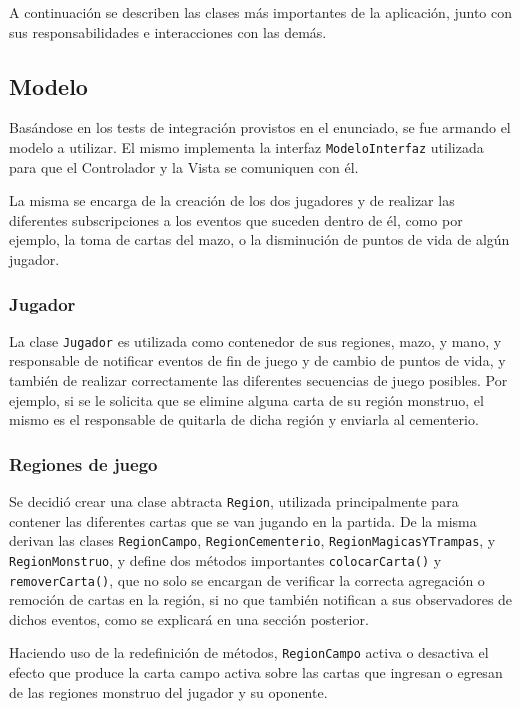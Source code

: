 	A continuación se describen las clases más importantes de la aplicación, junto con sus responsabilidades e interacciones con las demás.
	
	\subsection{Modelo}
	
	Basándose en los tests de integración provistos en el enunciado, se fue armando el modelo a utilizar. El mismo implementa la interfaz \texttt{ModeloInterfaz} utilizada para que el Controlador y la Vista se comuniquen con él.
	
	La misma se encarga de la creación de los dos jugadores y de realizar las diferentes subscripciones a los eventos que suceden dentro de él, como por ejemplo, la toma de cartas del mazo, o la disminución de puntos de vida de algún jugador.
	
	\subsubsection{Jugador}
	
	La clase \texttt{Jugador} es utilizada como contenedor de sus regiones, mazo, y mano, y responsable de notificar eventos de fin de juego y de cambio de puntos de vida, y también de realizar correctamente las diferentes secuencias de juego posibles. Por ejemplo, si se le solicita que se elimine alguna carta de su región monstruo, el mismo es el responsable de quitarla de dicha región y enviarla al cementerio.
	
	\subsubsection{Regiones de juego}
	
	Se decidió crear una clase abtracta \texttt{Region}, utilizada principalmente para contener las diferentes cartas que se van jugando en la partida. De la misma derivan las clases \texttt{RegionCampo}, \texttt{RegionCementerio}, \texttt{RegionMagicasYTrampas}, y \texttt{RegionMonstruo}, y define dos métodos importantes \texttt{colocarCarta()} y \texttt{removerCarta()}, que no solo se encargan de verificar la correcta agregación o remoción de cartas en la región, si no que también notifican a sus observadores de dichos eventos, como se explicará en una sección posterior.
	
	Haciendo uso de la redefinición de métodos, \texttt{RegionCampo} activa o desactiva el efecto que produce la carta campo activa sobre las cartas que ingresan o egresan de las regiones monstruo del jugador y su oponente.
	
